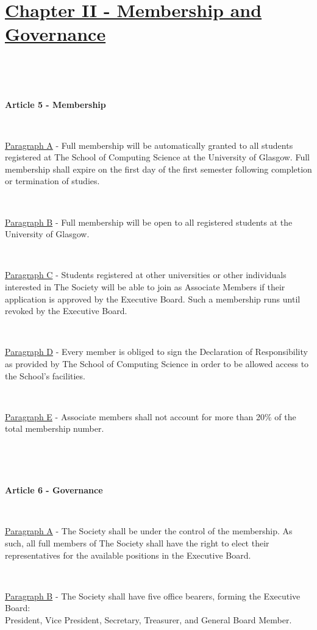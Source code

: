 \section{\underline{Chapter II - Membership and Governance}}

~

~

\large{\textbf{Article 5 - Membership}}

~

\underline{Paragraph A} - Full membership will be automatically granted
to all students registered at The School of Computing Science at the
University of Glasgow. Full membership shall expire on the first day of the first
semester following completion or termination of studies.

~

\underline{Paragraph B} - Full membership will be open to all registered
students at the University of Glasgow.

~

\underline{Paragraph C} - Students registered at other universities or
other individuals interested in The Society will be able to join as
Associate Members if their application is approved by the Executive Board.
Such a membership runs until revoked by the Executive Board.

~

\underline{Paragraph D} - Every member is obliged to sign the
Declaration of Responsibility as provided by The School of Computing
Science in order to be allowed access to the School's facilities.

~

\underline{Paragraph E} - Associate members shall not account for more
than 20\% of the total membership number.

~

~

\large{\textbf{Article 6 - Governance}}

~

\underline{Paragraph A} - The Society shall be under the control of the
membership. As such, all full members of The Society shall have the
right to elect their representatives for the available positions in the
Executive Board.

~

\underline{Paragraph B} - The Society shall have five office bearers,
forming the Executive Board:\\
President, Vice President, Secretary, Treasurer, and General Board Member.

